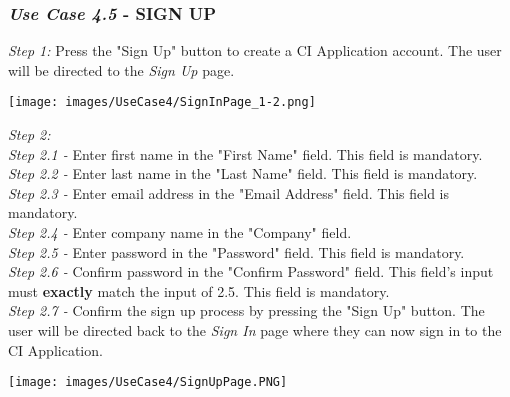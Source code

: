\documentclass[11pt]{article}
\begin{document}
        \subsubsection{\textit{Use Case 4.5} - \uppercase{Sign Up}}
            \textit{Step 1:} Press the "Sign Up" button to create a CI Application account. The user will be directed to the \textit{Sign Up} page.\\[0.5cm]
            \begin{center}
                \texttt{[image: images/UseCase4/SignInPage\_1-2.png]}
            \end{center}
            \textit{Step 2:}\\[0.5cm]
            \textit{Step 2.1 -} Enter first name in the "First Name" field. This field is mandatory.\\[0.5cm]
            \textit{Step 2.2 -} Enter last name in the "Last Name" field. This field is mandatory.\\[0.5cm]
            \textit{Step 2.3 -} Enter email address in the "Email Address" field. This field is mandatory.\\[0.5cm]
            \textit{Step 2.4 -} Enter company name in the "Company" field.\\[0.5cm]
            \textit{Step 2.5 -} Enter password in the "Password" field. This field is mandatory.\\[0.5cm]
            \textit{Step 2.6 -} Confirm password in the "Confirm Password" field. This field's input must \textbf{exactly} match the input of 2.5. This field is mandatory.\\[0.5cm]
            \textit{Step 2.7 -} Confirm the sign up process by pressing the "Sign Up" button. The user will be directed back to the \textit{Sign In} page where they can now sign in to the CI Application.\\[0.5cm]
            \begin{center}
                \texttt{[image: images/UseCase4/SignUpPage.PNG]}
            \end{center}
\end{document}
